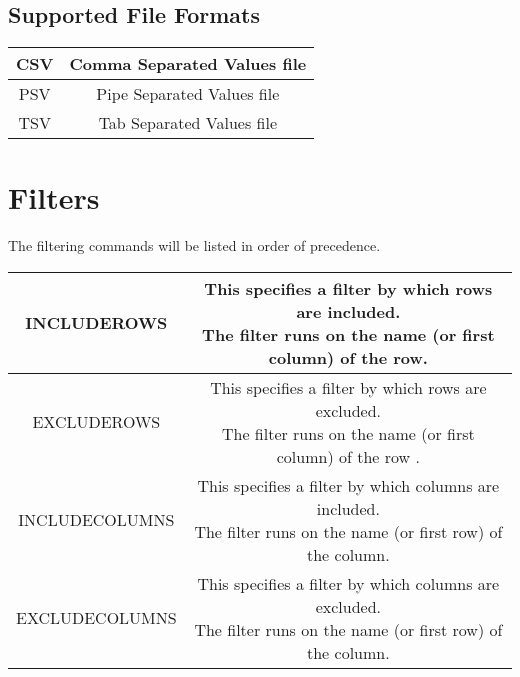 \documentclass[11pt]{article}
\begin{document}
\subsection{Supported File Formats}
\begin{center}
\begin{tabular}{ | c | c | }
\hline
CSV & Comma Separated Values file \\
\hline
PSV & Pipe Separated Values file \\
\hline
TSV & Tab Separated Values file \\
\hline
\end{tabular}
\end{center}

\section{Filters}
The filtering commands will be listed in order of precedence.
\\
\begin{center}
\begin{tabular}{ | c | c | }
\hline
INCLUDEROWS & \makecell{ This specifies a filter by which rows are included. \\ The filter runs on the name (or first column) of the row. } \\
\hline
EXCLUDEROWS & \makecell{ This specifies a filter by which rows are excluded. \\ The filter runs on the name (or first column) of the row .} \\
\hline
INCLUDECOLUMNS & \makecell{ This specifies a filter by which columns are included. \\ The filter runs on the name (or first row) of the column. } \\
\hline
EXCLUDECOLUMNS & \makecell{ This specifies a filter by which columns are excluded. \\ The filter runs on the name (or first row) of the column. } \\
\hline
\end{tabular}
\end{center}
\end{document}
